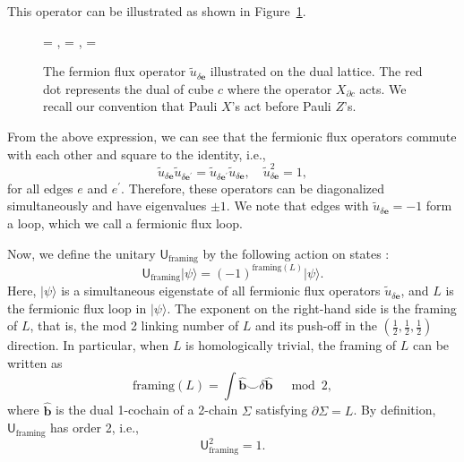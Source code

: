 \documentclass[aps,twocolumn,prx,floatfix,preprintnumbers, nofootinbib,10pt]{revtex4-2}
\numberwithin{equation}{section}
\theoremstyle{definition}
\theoremstyle{remark}
\theoremstyle{claim}
\def\ket#1{{|{#1}\rangle}}
\renewcommand{\sf}[1]{\mathsf{#1}}
\begin{document}
This operator can be illustrated as shown in Figure~\ref{fig: fermion flux}.
\begin{figure}[t]
\centering
{} = ,
 = ,
 = 
\caption{The fermion flux operator $\tilde{u}_{\delta \bm{e}}$ illustrated on the dual lattice. The red dot represents the dual of cube $c$ where the operator $X_{\partial c}$ acts. We recall our convention that Pauli $X$'s act before Pauli $Z$'s.}
\label{fig: fermion flux}
\end{figure}
From the above expression, we can see that the fermionic flux operators commute with each other and square to the identity, i.e.,
\begin{equation}
\tilde{u}_{\delta \bm{e}} \tilde{u}_{\delta \bm{e}^{\prime}} = \tilde{u}_{\delta \bm{e}^{\prime}} \tilde{u}_{\delta \bm{e}}, \quad
\tilde{u}_{\delta \bm{e}}^2 = 1,
\end{equation}
for all edges $e$ and $e^{\prime}$.
Therefore, these operators can be diagonalized simultaneously and have eigenvalues $\pm 1$.
We note that edges with $\tilde{u}_{\delta \bm{e}} = -1$ form a loop, which we call a fermionic flux loop.

Now, we define the unitary $\sf{U}_{\text{framing}}$ by the following action on states \cite{Fidkowski:2023dpe}:
\begin{equation}
\sf{U}_{\text{framing}} \ket{\psi} = (-1)^{\text{framing}(L)} \ket{\psi}.
\end{equation}
Here, $\ket{\psi}$ is a simultaneous eigenstate of all fermionic flux operators $\tilde{u}_{\delta \bm{e}}$, and $L$ is the fermionic flux loop in $\ket{\psi}$.
The exponent on the right-hand side is the framing of $L$, that is, the mod 2 linking number of $L$ and its push-off in the $(\frac{1}{2}, \frac{1}{2}, \frac{1}{2})$ direction.
In particular, when $L$ is homologically trivial, the framing of $L$ can be written as
\begin{equation}
\text{framing}(L) = \int \hat{\bm{b}} \smile \delta \hat{\bm{b}} \quad \bmod 2,
\label{eq: framing}
\end{equation}
where $\hat{\bm{b}}$ is the dual 1-cochain of a 2-chain $\Sigma$ satisfying $\partial \Sigma = L$.
By definition, $\sf{U}_{\text{framing}}$ has order 2, i.e.,
\begin{equation}
\sf{U}_{\text{framing}}^2 = 1.
\end{equation}
\end{document}
